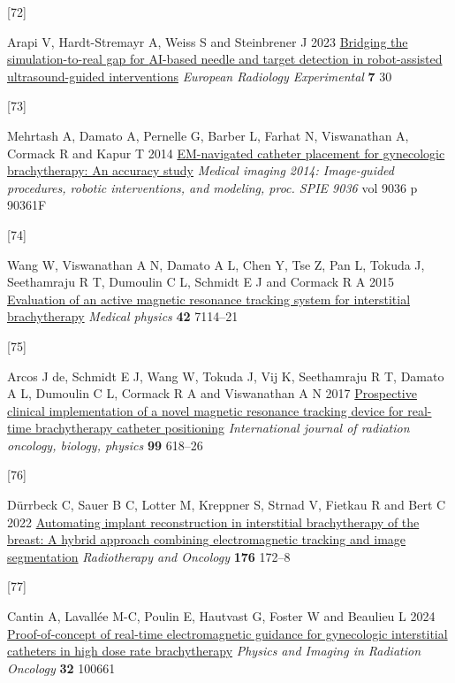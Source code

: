 \documentclass[
  11pt,
]{article}
\newlength{\cslhangindent}
\newlength{\csllabelwidth}
\newenvironment{CSLReferences}[2] %
 {\begin{list}{}{%
  \setlength{\itemindent}{0pt}
  \setlength{\leftmargin}{0pt}
  \setlength{\parsep}{0pt}
  \ifodd #1
   \setlength{\leftmargin}{\cslhangindent}
   \setlength{\itemindent}{-1\cslhangindent}
  \fi
  \setlength{\itemsep}{#2\baselineskip}}}
 {\end{list}}
\newcommand{\CSLLeftMargin}[1]{\parbox[t]{\csllabelwidth}{\strut#1\strut}}
\newcommand{\CSLRightInline}[1]{\parbox[t]{\linewidth - \csllabelwidth}{\strut#1\strut}}
\begin{document}
\begin{CSLReferences}{0}{1}
\CSLLeftMargin{{[}72{]} }%
\CSLRightInline{Arapi V, Hardt-Stremayr A, Weiss S and Steinbrener J
2023 \href{https://doi.org/10.1186/s41747-023-00344-x}{Bridging the
simulation-to-real gap for {AI}-based needle and target detection in
robot-assisted ultrasound-guided interventions} \emph{European Radiology
Experimental} \textbf{7} 30}

\CSLLeftMargin{{[}73{]} }%
\CSLRightInline{Mehrtash A, Damato A, Pernelle G, Barber L, Farhat N,
Viswanathan A, Cormack R and Kapur T 2014
\href{https://doi.org/10.1117/12.2044381}{EM-navigated catheter
placement for gynecologic brachytherapy: An accuracy study}
\emph{Medical imaging 2014: Image-guided procedures, robotic
interventions, and modeling, proc. SPIE 9036} vol 9036 p 90361F}

\CSLLeftMargin{{[}74{]} }%
\CSLRightInline{Wang W, Viswanathan A N, Damato A L, Chen Y, Tse Z, Pan
L, Tokuda J, Seethamraju R T, Dumoulin C L, Schmidt E J and Cormack R A
2015 \href{https://doi.org/10.1118/1.4935535}{Evaluation of an active
magnetic resonance tracking system for interstitial brachytherapy}
\emph{Medical physics} \textbf{42} 7114--21}

\CSLLeftMargin{{[}75{]} }%
\CSLRightInline{Arcos J de, Schmidt E J, Wang W, Tokuda J, Vij K,
Seethamraju R T, Damato A L, Dumoulin C L, Cormack R A and Viswanathan A
N 2017 \href{https://doi.org/10.1016/j.ijrobp.2017.05.054}{Prospective
clinical implementation of a novel magnetic resonance tracking device
for real-time brachytherapy catheter positioning} \emph{International
journal of radiation oncology, biology, physics} \textbf{99} 618--26}

\CSLLeftMargin{{[}76{]} }%
\CSLRightInline{Dürrbeck C, Sauer B C, Lotter M, Kreppner S, Strnad V,
Fietkau R and Bert C 2022
\href{https://doi.org/10.1016/j.radonc.2022.09.019}{Automating implant
reconstruction in interstitial brachytherapy of the breast: A hybrid
approach combining electromagnetic tracking and image segmentation}
\emph{Radiotherapy and Oncology} \textbf{176} 172--8}

\CSLLeftMargin{{[}77{]} }%
\CSLRightInline{Cantin A, Lavallée M-C, Poulin E, Hautvast G, Foster W
and Beaulieu L 2024
\href{https://doi.org/10.1016/j.phro.2024.100661}{Proof-of-concept of
real-time electromagnetic guidance for gynecologic interstitial
catheters in high dose rate brachytherapy} \emph{Physics and Imaging in
Radiation Oncology} \textbf{32} 100661}


\end{CSLReferences}
\end{document}
